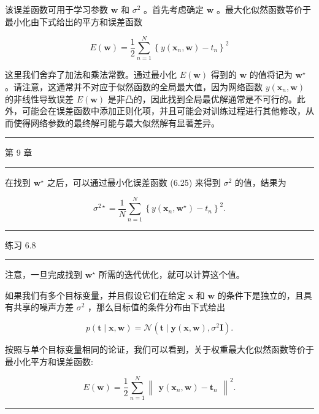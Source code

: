 \documentclass[10pt]{article}
\newcommand{\HRule}{\begin{center}\rule{0.9\linewidth}{0.2mm}\end{center}}
\begin{document}
该误差函数可用于学习参数 \(\mathbf{w}\) 和 \({\sigma }^{2}\) 。首先考虑确定 \(\mathbf{w}\) 。最大化似然函数等价于最小化由下式给出的平方和误差函数

\[
E\left( \mathbf{w}\right)  = \frac{1}{2}\mathop{\sum }\limits_{{n = 1}}^{N}{\left\{  y\left( {\mathbf{x}}_{n},\mathbf{w}\right)  - {t}_{n}\right\}  }^{2} \tag{6.26}
\]

这里我们舍弃了加法和乘法常数。通过最小化 \(E\left( \mathbf{w}\right)\) 得到的 \(\mathbf{w}\) 的值将记为 \({\mathbf{w}}^{ \star  }\) 。请注意，这通常并不对应于似然函数的全局最大值，因为网络函数 \(y\left( {{\mathbf{x}}_{n},\mathbf{w}}\right)\) 的非线性导致误差 \(E\left( \mathbf{w}\right)\) 是非凸的，因此找到全局最优解通常是不可行的。此外，可能会在误差函数中添加正则化项，并且可能会对训练过程进行其他修改，从而使得网络参数的最终解可能与最大似然解有显著差异。

\HRule

第 9 章

\HRule

在找到 \({\mathbf{w}}^{ \star  }\) 之后，可以通过最小化误差函数 (6.25) 来得到 \({\sigma }^{2}\) 的值，结果为

\[
{\sigma }^{2 \star  } = \frac{1}{N}\mathop{\sum }\limits_{{n = 1}}^{N}{\left\{  y\left( {\mathbf{x}}_{n},{\mathbf{w}}^{ \star  }\right)  - {t}_{n}\right\}  }^{2}. \tag{6.27}
\]

\HRule

练习 6.8

\HRule

注意，一旦完成找到 \({\mathbf{w}}^{ \star  }\) 所需的迭代优化，就可以计算这个值。

如果我们有多个目标变量，并且假设它们在给定 \(\mathbf{x}\) 和 \(\mathbf{w}\) 的条件下是独立的，且具有共享的噪声方差 \({\sigma }^{2}\) ，那么目标值的条件分布由下式给出

\[
p\left( {\mathbf{t} \mid  \mathbf{x},\mathbf{w}}\right)  = \mathcal{N}\left( {\mathbf{t} \mid  \mathbf{y}\left( {\mathbf{x},\mathbf{w}}\right) ,{\sigma }^{2}\mathbf{I}}\right) . \tag{6.28}
\]

按照与单个目标变量相同的论证，我们可以看到，关于权重最大化似然函数等价于最小化平方和误差函数:

\[
E\left( \mathbf{w}\right)  = \frac{1}{2}\mathop{\sum }\limits_{{n = 1}}^{N}{\begin{Vmatrix}\mathbf{y}\left( {\mathbf{x}}_{n},\mathbf{w}\right)  - {\mathbf{t}}_{n}\end{Vmatrix}}^{2}. \tag{6.29}
\]

\HRule
\end{document}
